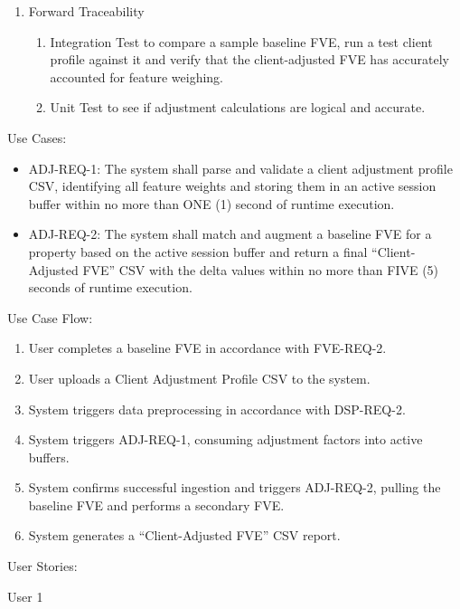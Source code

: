 \begin{enumerate}
\def\labelenumi{\alph{enumi}.}
\item
  Forward Traceability

  \begin{enumerate}
  \def\labelenumii{\roman{enumii}.}
  \item
    Integration Test to compare a sample baseline FVE, run a test client
    profile against it and verify that the client-adjusted FVE has
    accurately accounted for feature weighing.
  \item
    Unit Test to see if adjustment calculations are logical and
    accurate.
  \end{enumerate}
\end{enumerate}

Use Cases:

\begin{itemize}
\item
  ADJ-REQ-1: The system shall parse and validate a client adjustment
  profile CSV, identifying all feature weights and storing them in an
  active session buffer within no more than ONE (1) second of runtime
  execution.
\item
  ADJ-REQ-2: The system shall match and augment a baseline FVE for a
  property based on the active session buffer and return a final
  ``Client-Adjusted FVE'' CSV with the delta values within no more than
  FIVE (5) seconds of runtime execution.
\end{itemize}

Use Case Flow:

\begin{enumerate}
\def\labelenumi{\arabic{enumi}.}
\item
  User completes a baseline FVE in accordance with FVE-REQ-2.
\item
  User uploads a Client Adjustment Profile CSV to the system.
\item
  System triggers data preprocessing in accordance with DSP-REQ-2.
\item
  System triggers ADJ-REQ-1, consuming adjustment factors into active
  buffers.
\item
  System confirms successful ingestion and triggers ADJ-REQ-2, pulling
  the baseline FVE and performs a secondary FVE.
\item
  System generates a ``Client-Adjusted FVE'' CSV report.
\end{enumerate}

User Stories:

User 1

